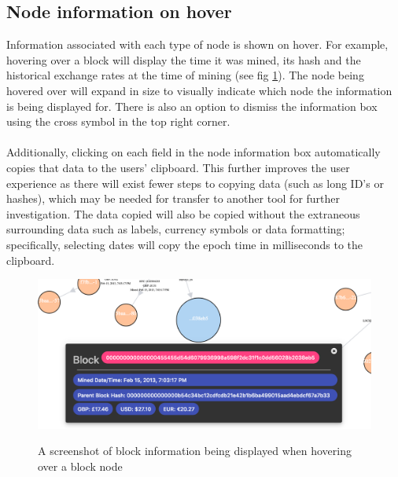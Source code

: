 \subsection{Node information on hover}
Information associated with each type of node is shown on hover. For example, hovering over a block will display the time it was mined, its hash and the historical exchange rates at the time of mining (see fig \ref{fig:block-info-on-hover}). The node being hovered over will expand in size to visually indicate which node the information is being displayed for. There is also an option to dismiss the information box using the cross symbol in the top right corner. 
\\\\
Additionally, clicking on each field in the node information box automatically copies that data to the users' clipboard. This further improves the user experience as there will exist fewer steps to copying data (such as long ID's or hashes), which may be needed for transfer to another tool for further investigation. The data copied will also be copied without the extraneous surrounding data such as labels, currency symbols or data formatting; specifically, selecting dates will copy the epoch time in milliseconds to the clipboard. 

\begin{figure}[h!]
  \centering
  \includegraphics[width = 15cm]{./figures/ui-screenshots/block-info}\\[0.5cm] 
  \caption{A screenshot of block information being displayed when hovering over a block node}
  \label{fig:block-info-on-hover}
\end{figure}

